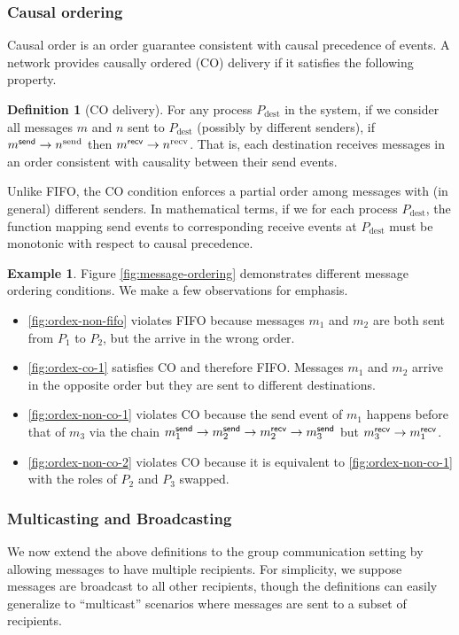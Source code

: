 \documentclass[]             %
{NASA}                       %
\theoremstyle{definition}
\newtheorem{example}[theorem]{Example}
\newtheorem{definition}[theorem]{Definition}
\providecommand{\tightlist}{%
  \setlength{\itemsep}{0pt}\setlength{\parskip}{0pt}}
\begin{document}
\subsubsection{Causal ordering}
Causal order is an order guarantee consistent with causal precedence
of events. A network provides causally ordered (CO) delivery if it
satisfies the following property.
\begin{definition}[CO delivery]
  \label{def:causalorder}
  For any process $P_\mathrm{dest}$ in the system, if we consider all
  messages $m$ and $n$ sent to $P_\mathrm{dest}$ (possibly by
  different senders), if $m_{}^{\mathsf{send}} \to n^\textrm{send}$ then
  $m_{}^{\mathsf{recv}} \to n^\textrm{recv}$. That is, each destination receives
  messages in an order consistent with causality between their send
  events.
\end{definition}
Unlike FIFO, the CO condition enforces a partial order among messages
with (in general) different senders. In mathematical terms, if we for
each process $P_{\mathrm{dest}}$, the function mapping send events to
corresponding receive events at $P_{\mathrm{dest}}$ must be monotonic
with respect to causal precedence.

\begin{example}
  Figure \ref{fig:message-ordering} demonstrates different message
  ordering conditions. We make a few observations for emphasis.

  \begin{itemize}
    \tightlist
  \item \ref{fig:ordex-non-fifo} violates FIFO because messages $m_1$
    and $m_2$ are both sent from $P_1$ to $P_2$, but the arrive in the wrong order.
  \item \ref{fig:ordex-co-1} satisfies CO and therefore FIFO. Messages
    $m_1$ and $m_2$ arrive in the opposite order but they are sent to
    different destinations.
  \item \ref{fig:ordex-non-co-1} violates CO because the send event of
    $m_1$ happens before that of $m_3$ via the chain
    $m_{1}^{\mathsf{send}} \to m_{2}^{\mathsf{send}} \to m_{2}^{\mathsf{recv}} \to m_{3}^{\mathsf{send}}$ but
    $m_{3}^{\mathsf{recv}} \to m_{1}^{\mathsf{recv}}$.
  \item \ref{fig:ordex-non-co-2} violates CO because it is equivalent to
    \ref{fig:ordex-non-co-1} with the roles of $P_2$ and $P_3$ swapped.
  \end{itemize}
\end{example}

\subsubsection{Multicasting and Broadcasting}
We now extend the above definitions to the group communication setting
by allowing messages to have multiple recipients. For simplicity, we
suppose messages are broadcast to all other recipients, though the
definitions can easily generalize to ``multicast'' scenarios where
messages are sent to a subset of recipients.
\end{document}
